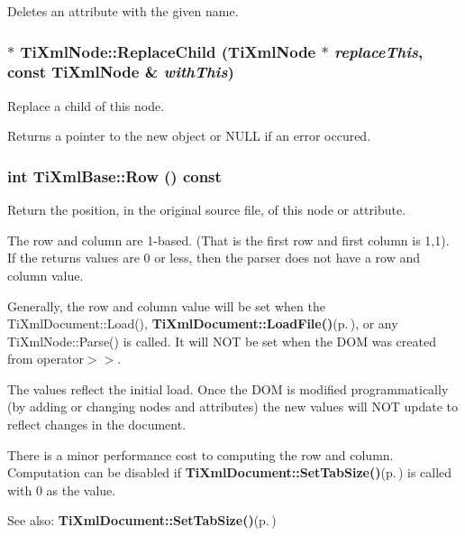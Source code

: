 Deletes an attribute with the given name. 

\subsubsection{ $\ast$ Ti\-Xml\-Node::Replace\-Child ({\bf Ti\-Xml\-Node} $\ast$ {\em replace\-This}, const {\bf Ti\-Xml\-Node} \& {\em with\-This})\hspace{0.3cm}{\tt  [inherited]}}\label{classTiXmlNode_TiXmlUnknowna36}


Replace a child of this node. 

Returns a pointer to the new object or NULL if an error occured.
\subsubsection{\setlength{\rightskip}{0pt plus 5cm}int Ti\-Xml\-Base::Row () const\hspace{0.3cm}{\tt  [inline, inherited]}}\label{classTiXmlBase_TiXmlUnknowna78}


Return the position, in the original source file, of this node or attribute. 

The row and column are 1-based. (That is the first row and first column is 1,1). If the returns values are 0 or less, then the parser does not have a row and column value.

Generally, the row and column value will be set when the Ti\-Xml\-Document::Load(), {\bf Ti\-Xml\-Document::Load\-File()}{\rm (p.\,\pageref{classTiXmlDocument_TiXmlDocumenta6})}, or any Ti\-Xml\-Node::Parse() is called. It will NOT be set when the DOM was created from operator$>$$>$.

The values reflect the initial load. Once the DOM is modified programmatically (by adding or changing nodes and attributes) the new values will NOT update to reflect changes in the document.

There is a minor performance cost to computing the row and column. Computation can be disabled if {\bf Ti\-Xml\-Document::Set\-Tab\-Size()}{\rm (p.\,\pageref{classTiXmlDocument_TiXmlDocumenta20})} is called with 0 as the value.

\begin{Desc}
\item[See also:]{\bf Ti\-Xml\-Document::Set\-Tab\-Size()}{\rm (p.\,\pageref{classTiXmlDocument_TiXmlDocumenta20})}\end{Desc}
